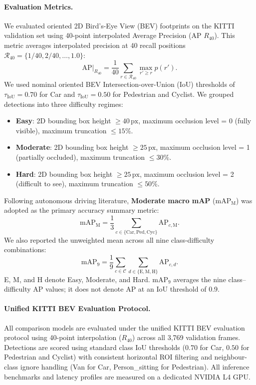 \paragraph{Evaluation Metrics.}
We evaluated oriented 2D Bird's-Eye View (BEV) footprints on the KITTI validation set using 40-point interpolated Average Precision (AP $R_{40}$). This metric averages interpolated precision at 40 recall positions $\mathcal{R}_{40} = \{1/40, 2/40, \dots, 1.0\}$:
\begin{equation}
    \mathrm{AP}|_{R_{40}} = \frac{1}{40} \sum_{r \in \mathcal{R}_{40}} \max_{r' \ge r} p(r').
\end{equation}
We used nominal oriented BEV Intersection-over-Union (IoU) thresholds of $\tau_{\mathrm{IoU}} = 0.70$ for Car and $\tau_{\mathrm{IoU}} = 0.50$ for Pedestrian and Cyclist. We grouped detections into three difficulty regimes:
\begin{itemize}
    \item \textbf{Easy}: 2D bounding box height $\ge 40\,\text{px}$, maximum occlusion level = 0 (fully visible), maximum truncation $\le 15\%$.
    \item \textbf{Moderate}: 2D bounding box height $\ge 25\,\text{px}$, maximum occlusion level = 1 (partially occluded), maximum truncation $\le 30\%$.
    \item \textbf{Hard}: 2D bounding box height $\ge 25\,\text{px}$, maximum occlusion level = 2 (difficult to see), maximum truncation $\le 50\%$.
\end{itemize}
Following autonomous driving literature, \textbf{Moderate macro mAP} ($\mathrm{mAP}_{\mathrm{M}}$) was adopted as the primary accuracy summary metric:
\begin{equation}
    \mathrm{mAP}_{\mathrm{M}} = \frac{1}{3} \sum_{c \in \{\mathrm{Car}, \mathrm{Ped}, \mathrm{Cyc}\}} \mathrm{AP}_{c, \mathrm{M}}.
\end{equation}
We also reported the unweighted mean across all nine class-difficulty combinations:
\begin{equation}
    \mathrm{mAP}_{9} = \frac{1}{9} \sum_{c \in \mathcal{C}} \sum_{d \in \{\mathrm{E}, \mathrm{M}, \mathrm{H}\}} \mathrm{AP}_{c, d}.
\end{equation}
E, M, and H denote Easy, Moderate, and Hard. $\mathrm{mAP}_{9}$ averages the nine class--difficulty AP values; it does not denote AP at an IoU threshold of 0.9.

\paragraph{Unified KITTI BEV Evaluation Protocol.}
All comparison models are evaluated under the unified KITTI BEV evaluation protocol using 40-point interpolation ($R_{40}$) across all 3,769 validation frames. Detections are scored using standard class IoU thresholds ($0.70$ for Car, $0.50$ for Pedestrian and Cyclist) with consistent horizontal ROI filtering and neighbour-class ignore handling (Van for Car, Person\_sitting for Pedestrian). All inference benchmarks and latency profiles are measured on a dedicated NVIDIA L4 GPU.

